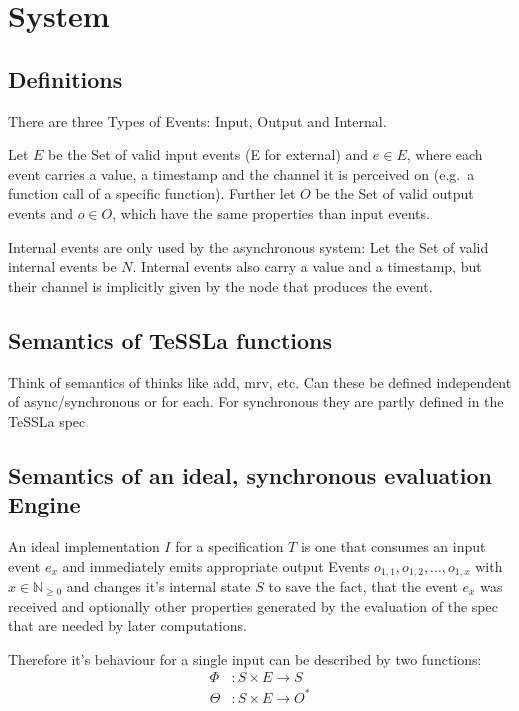 %
\chapter{System}
\label{sec:system}

\section{Definitions}
\label{sec:system:defs}

There are three Types of Events: Input, Output and Internal.

Let \(E\) be the Set of valid input events (E for external) and \(e \in E\), where each event carries a value, a timestamp and the
channel it is perceived on (e.g.\ a function call of a specific function).
Further let \(O\) be the Set of valid output events and \(o \in O\), which have the same properties than input events.

Internal events are only used by the asynchronous system: Let the Set of valid internal events be \(N\).
Internal events also carry a value and a timestamp, but their channel is implicitly given by the node that produces the event.

\section{Semantics of TeSSLa functions}
\label{sec:system:semantics_tessla_functions}
Think of semantics of thinks like add, mrv, etc.
Can these be defined independent of async/synchronous or for each.
For synchronous they are partly defined in the TeSSLa spec

\section{Semantics of an ideal, synchronous evaluation Engine}
\label{sec:system:semantics_ideal}
An ideal implementation \(I\) for a specification \(T\) is one that consumes an input event \(e_x\) and immediately emits
appropriate output Events \(o_{1,1}, o_{1,2}, \dots , o_{1,x}\) with \(x \in \mathbb{N}_{\ge0}\) and changes it's internal
state \(S\) to save the fact, that the event \(e_x\) was received and optionally other properties generated by the
evaluation of the spec that are needed by later computations.

Therefore it's behaviour for a single input can be described by two functions:
\begin{align*}
  \Phi&: S \times E \rightarrow S \\
  \Theta&: S \times E \rightarrow O^*
\end{align*}

